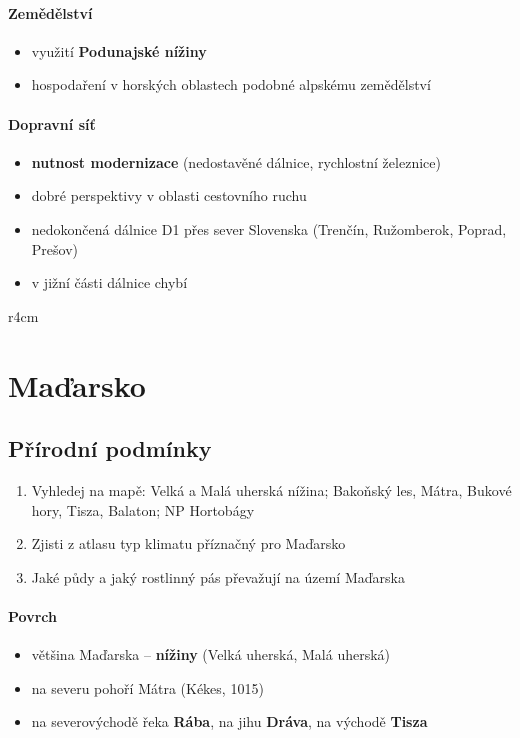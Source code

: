 \paragraph{Zemědělství}
\begin{itemize}
\item využití \textbf{Podunajské nížiny}
\item hospodaření v horských oblastech podobné alpskému zemědělství 
\end{itemize}

\paragraph{Dopravní síť}
\begin{itemize}
\item \textbf{nutnost modernizace} (nedostavěné dálnice, rychlostní železnice)
\item dobré perspektivy v oblasti cestovního ruchu
\item nedokončená dálnice D1 přes sever Slovenska (Trenčín, Ružomberok, Poprad, Prešov)
\item v jižní části dálnice chybí
\end{itemize}



\newpage
\mbox{}
\vspace{-1.5cm}
\begin{wrapfigure}{r}{4cm}
\vspace{-50pt}
\end{wrapfigure}	
\section{Maďarsko}
\subsection{Přírodní podmínky}
\begin{enumerate}
\item Vyhledej na mapě: Velká a Malá uherská nížina; Bakoňský les, Mátra, Bukové hory, Tisza, Balaton; NP Hortobágy
\item Zjisti z atlasu typ klimatu příznačný pro Maďarsko
\item Jaké půdy a jaký rostlinný pás převažují na území Maďarska
\end{enumerate}

\paragraph{Povrch}
\begin{itemize}
\item většina Maďarska -- \textbf{nížiny} (Velká uherská, Malá uherská)
\item na severu pohoří Mátra (Kékes, 1015)
\item na severovýchodě řeka \textbf{Rába}, na jihu \textbf{Dráva}, na východě\textbf{ Tisza}
\end{itemize}


